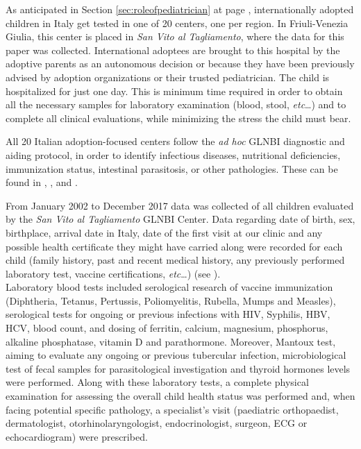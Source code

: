 

\label{chap:materialsandmethods}
As anticipated in Section \ref{sec:roleofpediatrician} at page \pageref{sec:roleofpediatrician},  internationally adopted children in Italy get tested in one of 20 centers, one per region. In Friuli-Venezia Giulia, this center is placed in \textit{San Vito al Tagliamento}, where the data for this paper was collected. International adoptees are brought to this hospital by the adoptive parents as an autonomous decision or because they have been previously advised by adoption organizations or their trusted pediatrician. The child is hospitalized for just one day. This is minimum time required in order to obtain all the necessary samples for laboratory examination (blood, stool, \textit{etc}\dots) and to complete all clinical evaluations, while minimizing the stress the child must bear.

All 20 Italian adoption-focused centers follow the \textit{ad hoc} GLNBI diagnostic and aiding protocol,  in order to identify infectious diseases, nutritional deficiencies, immunization status, intestinal parasitosis, or other pathologies. These can be found in \cite{GNLBI1}, \cite{GNLBI2}, and \cite{GNLBI3}.

From  January 2002 to  December 2017 data was collected of all children evaluated by the \textit{San Vito al Tagliamento} GLNBI Center. Data regarding date of birth, sex, birthplace, arrival date in Italy, date of the first visit at our clinic and any possible health certificate they might have carried along were recorded for each child (family history, past and recent medical history, any previously performed laboratory test, vaccine certifications, \textit{etc}\dots) (see \cite{redbook}).\\
Laboratory blood tests included serological research of vaccine immunization (Diphtheria, Tetanus, Pertussis, Poliomyelitis, Rubella, Mumps and Measles), serological tests for ongoing or previous infections with HIV, Syphilis, HBV, HCV, blood count, and dosing of ferritin, calcium, magnesium, phosphorus, alkaline phosphatase, vitamin D and parathormone. Moreover, Mantoux test, aiming to evaluate any ongoing or previous tubercular infection, microbiological test of fecal samples for parasitological investigation and thyroid hormones levels were performed.
Along with these laboratory tests, a complete physical examination for assessing the overall child health status was performed and, when facing potential specific pathology, a specialist’s visit (paediatric orthopaedist, dermatologist, otorhinolaryngologist, endocrinologist, surgeon, ECG or echocardiogram) were prescribed.

